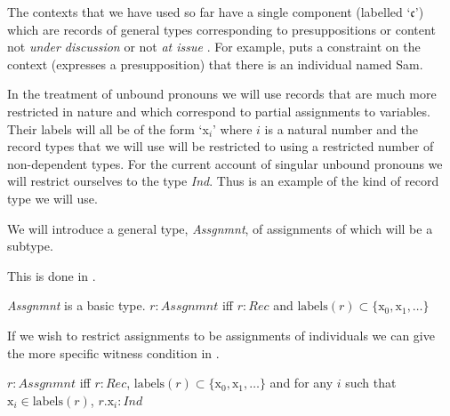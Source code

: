The
contexts that we have used so far have a single component (labelled
`$\mathfrak{c}$') which are records of general types corresponding to presuppositions
\citep{BeaverGeurts2014} or content not \textit{under discussion}
\citep{Ginzburg1994,Ginzburg2012}  or not \textit{at issue}
\citep{Potts2005}.  For example, \nexteg{} puts a constraint on the
context (expresses a presupposition) that there is an individual named
Sam.
\begin{ex} 
\end{ex} 
In the treatment of unbound pronouns we will use records that are much
more restricted in nature and which correspond to partial assignments to 
variables.  Their labels will all be of the form `x$_i$' where $i$ is
a natural number and the record types that we will use will be
restricted to using a restricted number of non-dependent types. For the
current account of singular unbound pronouns we will restrict
ourselves to the type \textit{Ind}.  Thus \nexteg{} is an example of
the kind of record type we will use.
\begin{ex} 
\end{ex}
We will introduce a general type, \textit{Assgnmnt}, of assignments
of which \preveg{} will be a subtype.
\begin{shaded}
This is done in \nexteg{}.
\begin{ex} 
\textit{Assgnmnt} is a basic type.  $r:\textit{Assgnmnt}$ iff
$r:\textit{Rec}$ and $\mathrm{labels}(r)\subset\{\text{x}_0,\text{x}_1,\ldots\}$ 
\end{ex} 
If we wish to restrict assignments to be assignments of individuals we
can give the more specific witness condition in \nexteg{}.
\begin{ex} 
$r:\textit{Assgnmnt}$ iff
$r:\textit{Rec}$, $\mathrm{labels}(r)\subset\{\text{x}_0,\text{x}_1,\ldots\}$ and
for any $i$ such that $\text{x}_i\in\mathrm{labels}(r)$, $r.\text{x}_i:\textit{Ind}$
\end{ex} 
\end{shaded}  
  
